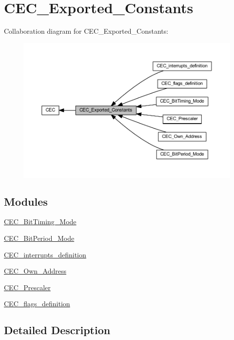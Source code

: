\hypertarget{group___c_e_c___exported___constants}{}\section{C\+E\+C\+\_\+\+Exported\+\_\+\+Constants}
\label{group___c_e_c___exported___constants}
Collaboration diagram for C\+E\+C\+\_\+\+Exported\+\_\+\+Constants\+:
\nopagebreak
\begin{figure}[H]
\begin{center}
\leavevmode
\includegraphics[width=350pt]{group___c_e_c___exported___constants}
\end{center}
\end{figure}
\subsection*{Modules}
\begin{DoxyCompactItemize}
\item 
\hyperlink{group___c_e_c___bit_timing___mode}{C\+E\+C\+\_\+\+Bit\+Timing\+\_\+\+Mode}
\item 
\hyperlink{group___c_e_c___bit_period___mode}{C\+E\+C\+\_\+\+Bit\+Period\+\_\+\+Mode}
\item 
\hyperlink{group___c_e_c__interrupts__definition}{C\+E\+C\+\_\+interrupts\+\_\+definition}
\item 
\hyperlink{group___c_e_c___own___address}{C\+E\+C\+\_\+\+Own\+\_\+\+Address}
\item 
\hyperlink{group___c_e_c___prescaler}{C\+E\+C\+\_\+\+Prescaler}
\item 
\hyperlink{group___c_e_c__flags__definition}{C\+E\+C\+\_\+flags\+\_\+definition}
\end{DoxyCompactItemize}


\subsection{Detailed Description}
